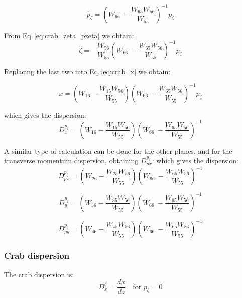 \begin{equation}
  \hat{p}_\zeta = \left( W_{66}\ -  \frac{W_{65}W_{56}}{W_{55}} \right)^{-1}p_\zeta
\end{equation}

From Eq.\,\ref{eq:crab_zeta_pzeta} we obtain:
\begin{equation}
\hat{\zeta} = - \frac{W_{56}}{W_{55}}\left( W_{66}\ -  \frac{W_{65}W_{56}}{W_{55}} \right)^{-1} p_\zeta
\end{equation}

Replacing the last two into Eq.\,\ref{eq:crab_x} we obtain:

\begin{equation}
x = \left(W_{16} -\frac{W_{15}W_{56}}{W_{55}}\right)\left( W_{66}\ -  \frac{W_{65}W_{56}}{W_{55}} \right)^{-1} p_\zeta
\end{equation}

which gives the dispersion:
\begin{equation}
D_{x}^{p_\zeta} = \left(W_{16} -\frac{W_{15}W_{56}}{W_{55}}\right)\left( W_{66}\ -  \frac{W_{65}W_{56}}{W_{55}} \right)^{-1}
\end{equation}

A similar type of calculation can be done for the other planes, and for the transverse momentum dispersion, obtaining $D_{px}^{p_\zeta}$:
which gives the dispersion:
\begin{equation}
D_{px}^{p_\zeta} = \left(W_{26} -\frac{W_{25}W_{56}}{W_{55}}\right)\left( W_{66}\ -  \frac{W_{65}W_{56}}{W_{55}} \right)^{-1}
\end{equation}

\begin{equation}
D_{y}^{p_\zeta} = \left(W_{36} -\frac{W_{35}W_{56}}{W_{55}}\right)\left( W_{66}\ -  \frac{W_{65}W_{56}}{W_{55}} \right)^{-1}
\end{equation}

\begin{equation}
D_{py}^{p_\zeta} = \left(W_{46} -\frac{W_{45}W_{56}}{W_{55}}\right)\left( W_{66}\ -  \frac{W_{65}W_{56}}{W_{55}} \right)^{-1}
\end{equation}

\subsubsection{Crab dispersion}

The crab dispersion is:
\begin{equation}
D_x^\zeta = \frac{dx}{dz} \quad \text{for } p_\zeta=0
\end{equation}

